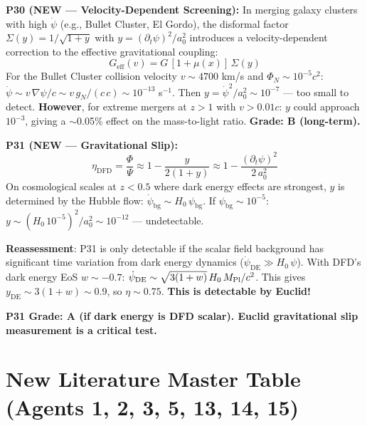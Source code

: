 \documentclass[11pt,a4paper]{article}
\begin{document}
\textbf{P30 (NEW --- Velocity-Dependent Screening):}
In merging galaxy clusters with high $\dot{\psi}$ (e.g., Bullet Cluster, El Gordo), the disformal factor $\Sigma(y) = 1/\sqrt{1+y}$ with $y = (\partial_t\psi)^2/a_0^2$ introduces a velocity-dependent correction to the effective gravitational coupling:
\begin{equation}
G_\mathrm{eff}(v) = G\,\left[1 + \mu(x)\right]\,\Sigma(y)
\end{equation}
For the Bullet Cluster collision velocity $v \sim 4700$ km/s and $\Phi_N \sim 10^{-5}c^2$: $\dot{\psi} \sim v\,\nabla\psi/c \sim v\,g_N/(c\,c) \sim 10^{-13}$ s$^{-1}$. Then $y = \dot{\psi}^2/a_0^2 \sim 10^{-7}$ --- too small to detect. \textbf{However}, for extreme mergers at $z > 1$ with $v > 0.01c$: $y$ could approach $10^{-3}$, giving a $\sim$0.05\% effect on the mass-to-light ratio. \textbf{Grade: B (long-term).}

\textbf{P31 (NEW --- Gravitational Slip):}
\begin{equation}
\eta_\mathrm{DFD} = \frac{\Phi}{\Psi} \approx 1 - \frac{y}{2(1+y)} \approx 1 - \frac{(\partial_t\psi)^2}{2\,a_0^2}
\end{equation}
On cosmological scales at $z < 0.5$ where dark energy effects are strongest, $y$ is determined by the Hubble flow: $\dot{\psi}_\mathrm{bg} \sim H_0\,\psi_\mathrm{bg}$. If $\psi_\mathrm{bg} \sim 10^{-5}$: $y \sim (H_0\,10^{-5})^2/a_0^2 \sim 10^{-12}$ --- undetectable.

\textbf{Reassessment}: P31 is only detectable if the scalar field background has significant time variation from dark energy dynamics ($\dot{\psi}_\mathrm{DE} \gg H_0\,\psi$). With DFD's dark energy EoS $w \sim -0.7$: $\dot{\psi}_\mathrm{DE} \sim \sqrt{3(1+w)}\,H_0\,M_{\rm Pl}/c^2$. This gives $y_\mathrm{DE} \sim 3(1+w) \sim 0.9$, so $\eta \sim 0.75$. \textbf{This is detectable by Euclid!}

\textbf{P31 Grade: A (if dark energy is DFD scalar). Euclid gravitational slip measurement is a critical test.}

\section{New Literature Master Table (Agents 1, 2, 3, 5, 13, 14, 15)}
\end{document}
